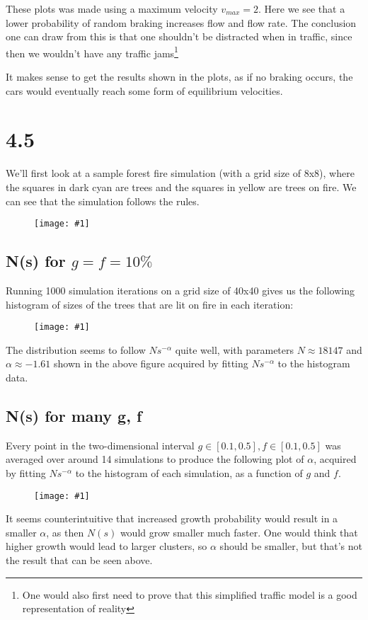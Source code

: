 \documentclass[11pt]{article}
\newcommand{\singlewiderfigure}[1]{
\begin{figure}[H]
  \centering
  \begin{minipage}{0.6\textwidth}
    \centering
    \texttt{[image: \#1]}
  \end{minipage}
\end{figure}
}
\begin{document}
These plots was made using a maximum velocity $v_{max} = 2$. Here we see that a lower probability of random braking increases flow and flow rate.
The conclusion one can draw from this is that one shouldn't be distracted when in traffic, since then we wouldn't have any traffic jams\footnote{One would also first need to prove that this simplified traffic model is a good representation of reality}

It makes sense to get the results shown in the plots, as if no braking occurs, the cars would eventually reach some form of equilibrium velocities.

\pagebreak

\section*{4.5}
We'll first look at a sample forest fire simulation (with a grid size of 8x8), where the squares in dark cyan are trees and the squares in yellow are trees on fire. 
We can see that the simulation follows the rules.
\singlewiderfigure{./plots/4_5/sample.png}

\subsection*{N(s) for $g = f = 10\%$}
Running 1000 simulation iterations on a grid size of 40x40 gives us the following histogram of sizes of the trees that are lit on fire in each iteration:
\singlewiderfigure{./plots/4_5/histogram.png}
The distribution seems to follow $N s^{-\alpha}$ quite well, with parameters $N \approx 18147$ and $\alpha \approx -1.61$ shown in the above figure acquired by fitting $N s^{-\alpha}$ to the histogram data.

\subsection*{N(s) for many g, f}
Every point in the two-dimensional interval $g \in [0.1, 0.5], f \in [0.1, 0.5]$ was averaged over around 14 simulations 
to produce the following plot of $\alpha$, acquired by fitting $N s^{-\alpha}$ to the histogram of each simulation, as a function of $g$ and $f$.
\singlewiderfigure{./plots/4_5/parameters.png}
It seems counterintuitive that increased growth probability would result in a smaller $\alpha$, as then $N(s)$ would grow smaller much faster.
One would think that higher growth would lead to larger clusters, so $\alpha$ should be smaller, but that's not the result that can be seen above.
\end{document}
